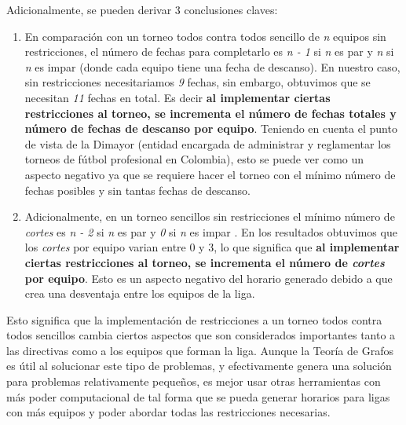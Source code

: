 \documentclass[11pt]{article}
\begin{document}
\begin{multicols}{2}
            Adicionalmente, se pueden derivar 3 conclusiones claves:
            \begin{enumerate}
                \item En comparación con un torneo todos contra todos sencillo de \textit{n} equipos sin restricciones, el número de fechas para completarlo es \textit{n - 1} si \textit{n} es par y \textit{n} si \textit{n} es impar (donde cada equipo tiene una fecha de descanso).
                En nuestro caso, sin restricciones necesitariamos \textit{9} fechas, sin embargo, obtuvimos que se necesitan \textit{11} fechas en total. Es decir \textbf{al implementar ciertas restricciones al torneo, se incrementa el número de fechas totales y número de fechas de descanso por equipo}.
                Teniendo en cuenta el punto de vista de la Dimayor (entidad encargada de administrar y reglamentar los torneos de fútbol profesional en Colombia), 
                esto se puede ver como un aspecto negativo ya que se requiere hacer el torneo con el mínimo número de fechas posibles y sin tantas fechas de descanso.
                \item Adicionalmente, en un torneo sencillos sin restricciones el mínimo número de \textit{cortes} es \textit{n - 2} si \textit{n} es par y \textit{0} si \textit{n} es impar \cite{de1988some}.  
                En los resultados obtuvimos que los \textit{cortes} por equipo varian entre 0 y 3, lo que significa que \textbf{al implementar ciertas restricciones al torneo, se incrementa el número de \textit{cortes} por equipo}.
                Esto es un aspecto negativo del horario generado debido a que crea una desventaja entre los equipos de la liga.           
            \end{enumerate}
            
            Esto significa que la implementación de restricciones a un torneo todos contra todos sencillos cambia ciertos aspectos que son considerados importantes tanto a las directivas como a los equipos que forman la liga.
            Aunque la Teoría de Grafos es útil al solucionar este tipo de problemas, y efectivamente genera una solución para problemas relativamente pequeños, es mejor usar otras herramientas con más poder computacional de 
            tal forma que se pueda generar horarios para ligas con más equipos y poder abordar todas las restricciones necesarias.  
            
        
        
        \nocite{lewis2011application}
        \nocite{de1990constrained}
        \nocite{hoshino2013graph}
    \end{multicols}
\end{document}
